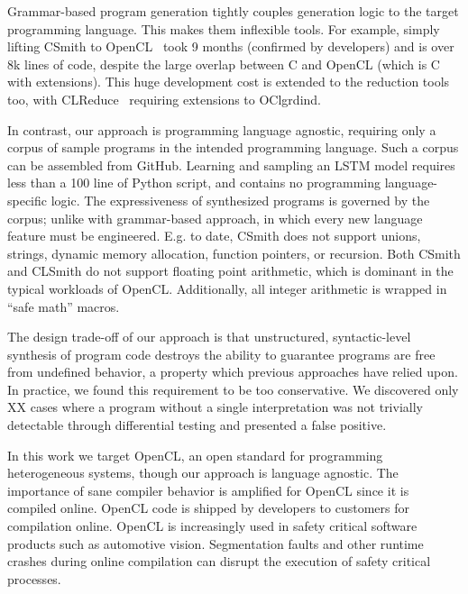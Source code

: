 Grammar-based program generation tightly couples generation logic to the target programming language. This makes them inflexible tools. For example, simply lifting CSmith to OpenCL~\cite{Lidbury2015a} took 9 months (confirmed by developers) and is over 8k lines of code, despite the large overlap between C and OpenCL (which is C with extensions). This huge development cost is extended to the reduction tools too, with CLReduce~\cite{Pflanzer2016} requiring extensions to OClgrdind.

In contrast, our approach is programming language agnostic, requiring only a corpus of sample programs in the intended programming language. Such a corpus can be assembled from GitHub. Learning and sampling an LSTM model requires less than a 100 line of Python script, and contains no programming language-specific logic. The expressiveness of synthesized programs is governed by the corpus; unlike with grammar-based approach, in which every new language feature must be engineered. E.g. to date, CSmith does not support unions, strings, dynamic memory allocation, function pointers, or recursion. Both CSmith and CLSmith do not support floating point arithmetic, which is dominant in the typical workloads of OpenCL. Additionally, all integer arithmetic is wrapped in ``safe math'' macros.

The design trade-off of our approach is that unstructured, syntactic-level synthesis of program code destroys the ability to guarantee programs are free from undefined behavior, a property which previous approaches have relied upon. In practice, we found this requirement to be too conservative. We discovered only XX cases where a program without a single interpretation was not trivially detectable through differential testing and presented a false positive.

In this work we target OpenCL, an open standard for programming heterogeneous systems, though our approach is language agnostic. The importance of sane compiler behavior is amplified for OpenCL since it is compiled online. OpenCL code is shipped by developers to customers for compilation online. OpenCL is increasingly used in safety critical software products such as automotive vision. Segmentation faults and other runtime crashes during online compilation can disrupt the execution of safety critical processes.

